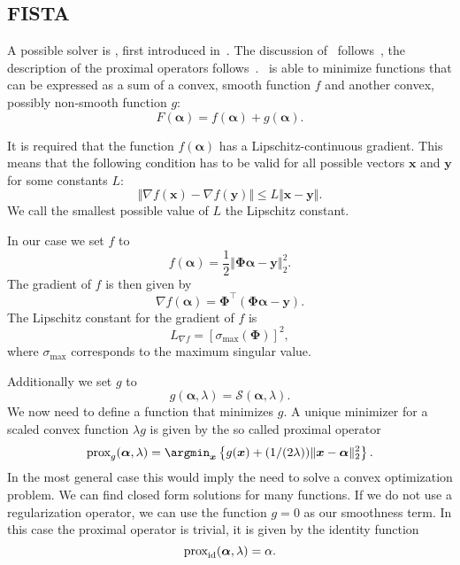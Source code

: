 \subsection{FISTA}
A possible solver is \fista, first introduced in~\cite{fista}.
The discussion of \fista\ follows~\cite{fista}, the description of
the proximal operators follows~\cite{proxsurvey}.
\fista\ is able to minimize functions that can be expressed as a sum of a convex,
smooth function \(f\) and another convex, possibly non-smooth function \(g\): 
\begin{equation}\label{eq:composite-goal}
F(\bm{\alpha}) = f(\bm{\alpha}) + g(\bm{\alpha}). 
\end{equation}

It is required that the function \(f(\bm{\alpha})\) has a Lipschitz-continuous gradient. 
This means that the following condition has to be valid for all possible
vectors \(\bm{x}\) and \(\bm{y}\) for some constants \(L\):
\begin{equation}   \label{eq:lipschitz}
 \Vert \nabla f(\bm{x}) - \nabla f(\bm{y}) \Vert \leq L \Vert \bm{x} - \bm{y} \Vert.
\end{equation}
We call the smallest possible value of \(L\) the Lipschitz constant.

In our case we set \(f\) to
\begin{equation*}
 f(\bm{\alpha}) = \frac{1}{2} \left\Vert  \bm{\Phi} \bm{\alpha} - \bm{y}   \right\Vert_2^2.
\end{equation*}
The gradient of \(f\) is then given by
\begin{equation*}
  \nabla f(\bm{\alpha}) = \bm{\Phi}^\intercal \left(\bm{\Phi} \bm{\alpha} - \bm{y} \right).
\end{equation*}
The Lipschitz constant for the gradient of \(f\) is
\begin{equation}
  \label{eq:lipf}
  L_{\nabla f} = {\left[\sigma_{\max} \left(\bm{\Phi}\right)\right]}^2,
\end{equation}
where \(\sigma_{\max} \) corresponds to the maximum singular value.

Additionally we set \(g\) to
\begin{equation*}
  g(\bm{\alpha}, \lambda) = \mathcal{S} \left( \bm{\alpha}, \lambda \right).
\end{equation*}
We now need to define a function that minimizes \(g\).
A unique minimizer for a scaled convex function \(\lambda g\) is given by the so called
proximal operator 
\begin{equation}
  \label{eq:proximal}
  \prox[\(g\)]{\bm{\alpha}}{\lambda}= \argmin_{\bm{x}} \left\{ g (\bm{x}) + (1/ (2 \lambda)) \Vert \bm{x} - \bm{\alpha} \Vert_2^2 \right\}.
\end{equation}
In the most general case this would imply the need to solve a convex
optimization problem.
We can find closed form solutions for many functions.
If we do not use a regularization operator, we can use the function \(g = 0\) as
our smoothness term.
In this case the proximal operator is trivial, it is given by the identity
function
\begin{equation*}
 \prox[id]{\bm{\alpha}}{\lambda} = \alpha.
\end{equation*}

